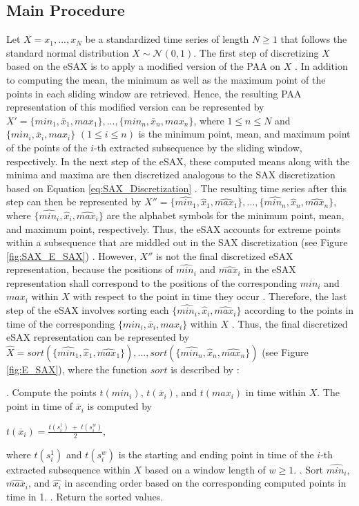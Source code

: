\subsection*{Main Procedure}
Let $X = x_1, ..., x_N$ be a standardized time series of length $N \geq 1$ that follows the standard normal distribution $X \sim \mathcal{N}(0,1)$. The first step of discretizing $X$ based on the \ac{eSAX} is to apply a modified version of the PAA on $X$ \cite{E_SAX}. In addition to computing the mean, the minimum as well as the maximum point of the points in each sliding window are retrieved. Hence, the resulting \ac{PAA} representation of this modified version can be represented by $X' = \{min_1, \overline{x}_1, max_1\}, ..., \{min_n, \overline{x}_n, max_n\}$, where $1 \leq n \leq N$ and $\{min_i, \overline{x}_i, max_i\}$ $(1 \leq i \leq n)$ is the minimum point, mean, and maximum point of the points of the $i$-th extracted subsequence by the sliding window, respectively. \newline
In the next step of the \ac{eSAX}, these computed means along with the minima and maxima are then discretized analogous to the \ac{SAX} discretization based on Equation \ref{eq:SAX_Discretization} \cite{E_SAX}. The resulting time series after this step can then be represented by $X'' = \{\hat{min_1}, \hat{x}_1, \hat{max_1}\}, ..., \{\hat{min_n}, \hat{x}_n, \hat{max_n}\}$, where $\{\hat{min_i}, \hat{x}_i, \hat{max_i}\}$ are the alphabet symbols for the minimum point, mean, and maximum point, respectively. Thus, the \ac{eSAX} accounts for extreme points within a subsequence that are middled out in the \ac{SAX} discretization (see Figure \ref{fig:SAX_E_SAX}) \cite{E_SAX}. \newline
However, $X''$ is not the final discretized \ac{eSAX} representation, because the positions of $\hat{min_i}$ and $\hat{max_i}$ in the \ac{eSAX} representation shall correspond to the positions of the corresponding $min_i$ and $max_i$ within $X$ with respect to the point in time they occur \cite{E_SAX}. \newline
Therefore, the last step of the \ac{eSAX} involves sorting each $\{\hat{min_i}, \hat{x}_i, \hat{max_i}\}$ according to the points in time of the corresponding $\{min_i, \overline{x}_i, max_i\}$ within $X$ \cite{E_SAX}. Thus, the final discretized \ac{eSAX} representation can be represented by $\hat{X} = sort(\{\hat{min_1}, \hat{x}_1, \hat{max_1}\}), ..., sort(\{\hat{min_n}, \hat{x}_n, \hat{max_n}\})$ (see Figure \ref{fig:E_SAX}), where the function $sort$ is described by \cite{E_SAX}:
\begin{algorithmic}
. Compute the points $t(min_i)$, $t(\overline{x}_i)$, and $t(max_i)$ in time within $X$. The point in time of $\overline{x}_i$ is computed by 
\begin{center}
$t(\overline{x}_i) = \frac{t(s_i^1) \;+\; t(s_i^w)}{2}$,
\end{center}
where $t(s_i^1)$ and $t(s_i^w)$ is the starting and ending point in time of the $i$-th extracted subsequence within $X$ based on a window length of $w \geq 1$.
. Sort $\hat{min_i}$, $\hat{max_i}$, and $\hat{x_i}$ in ascending order based on the corresponding computed points in time in 1.
. Return the sorted values.
\end{algorithmic}
